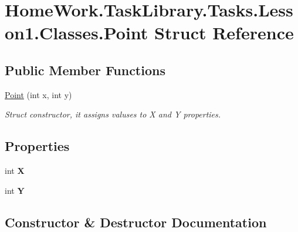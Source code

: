 \hypertarget{struct_home_work_1_1_task_library_1_1_tasks_1_1_lesson1_1_1_classes_1_1_point}{}\section{Home\+Work.\+Task\+Library.\+Tasks.\+Lesson1.\+Classes.\+Point Struct Reference}
\label{struct_home_work_1_1_task_library_1_1_tasks_1_1_lesson1_1_1_classes_1_1_point}
\subsection*{Public Member Functions}
\begin{DoxyCompactItemize}
\item 
\mbox{\hyperlink{struct_home_work_1_1_task_library_1_1_tasks_1_1_lesson1_1_1_classes_1_1_point_a201381a8c24113c6fe834fc379692dab}{Point}} (int x, int y)
\begin{DoxyCompactList}\small\item\em Struct constructor, it assigns valuses to X and Y properties. \end{DoxyCompactList}\end{DoxyCompactItemize}
\subsection*{Properties}
\begin{DoxyCompactItemize}
\item 
\mbox{\label{struct_home_work_1_1_task_library_1_1_tasks_1_1_lesson1_1_1_classes_1_1_point_a60b5ae24921015aedfc27c2762d413b1}} 
int {\bfseries X}
\item 
\mbox{\label{struct_home_work_1_1_task_library_1_1_tasks_1_1_lesson1_1_1_classes_1_1_point_adcba7085477ff70a79611f6018201ed6}} 
int {\bfseries Y}
\end{DoxyCompactItemize}


\subsection{Constructor \& Destructor Documentation}
\mbox{\label{struct_home_work_1_1_task_library_1_1_tasks_1_1_lesson1_1_1_classes_1_1_point_a201381a8c24113c6fe834fc379692dab}} 
